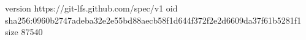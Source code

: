 version https://git-lfs.github.com/spec/v1
oid sha256:0960b2747adeba32e2e55bd88aecb58f1d644f372f2e2d6609da37f61b5281f1
size 87540
